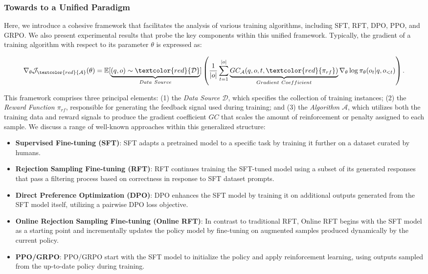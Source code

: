 \begin{itemize}[topsep=0pt]
\begin{itemize}[topsep=0pt]
\subsubsection{Towards to a Unified Paradigm} Here, we introduce a cohesive framework that facilitates the analysis of various training algorithms, including SFT, RFT, DPO, PPO, and GRPO. We also present experimental results that probe the key components within this unified framework. Typically, the gradient of a training algorithm with respect to its parameter $\theta$ is expressed as:

\begin{equation}
    \nabla_{\theta}\mathcal{J}_{\textcolor{red}{\mathcal{A}}}(\theta) = \mathbb{E}[\underbrace{(q,o) \sim \textcolor{red}{\mathcal{D}}}_{Data \ Source}]\left( \frac{1}{|o|} \sum_{t=1}^{|o|}  \underbrace{GC_{{\mathcal{A}}}(q, o, t, \textcolor{red}{\pi_{{rf}}})}_{Gradient \ Coefficient}  \nabla_{\theta}\log \pi_{\theta}(o_t | q, o_{<t})\right).
\label{eq:objective}
\end{equation}

This framework comprises three principal elements: (1) the \textit{Data Source $\mathcal{D}$}, which specifies the collection of training instances; (2) the \textit{Reward Function $\pi_{{rf}}$}, responsible for generating the feedback signal used during training; and (3) the \textit{Algorithm $\mathcal{A}$}, which utilizes both the training data and reward signals to produce the gradient coefficient $GC$ that scales the amount of reinforcement or penalty assigned to each sample. We discuss a range of well-known approaches within this generalized structure:

\begin{itemize}
    \item  \textbf{Supervised Fine-tuning (SFT)}: SFT adapts a pretrained model to a specific task by training it further on a dataset curated by humans.
    \item \textbf{Rejection Sampling Fine-tuning (RFT)}: RFT continues training the SFT-tuned model using a subset of its generated responses that pass a filtering process based on correctness in response to SFT dataset prompts.
    \item \textbf{Direct Preference Optimization (DPO)}: DPO enhances the SFT model by training it on additional outputs generated from the SFT model itself, utilizing a pairwise DPO loss objective.
    \item \textbf{Online Rejection Sampling Fine-tuning (Online RFT)}: In contrast to traditional RFT, Online RFT begins with the SFT model as a starting point and incrementally updates the policy model by fine-tuning on augmented samples produced dynamically by the current policy.
    \item \textbf{PPO/GRPO}: PPO/GRPO start with the SFT model to initialize the policy and apply reinforcement learning, using outputs sampled from the up-to-date policy during training.
\end{itemize}


\end{itemize}
\end{itemize}
